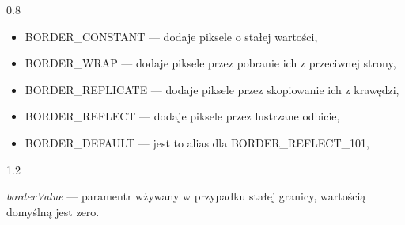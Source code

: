 \documentclass[a4paper,12pt]{article}
\newcommand\spacingInSimpleItemize{0.8}
\newcommand\spacingInSolemnItemize{1.2}
\begin{document}
\begin{spacing}{\spacingInSimpleItemize}
\begin{itemize}
                    \begin{itemize}
                    \item BORDER\_CONSTANT --- dodaje piksele o stałej wartości,\\
                    \item BORDER\_WRAP --- dodaje piksele przez pobranie ich z przeciwnej strony,\\
                    \item BORDER\_REPLICATE --- dodaje piksele przez skopiowanie ich z krawędzi,\\
                    \item BORDER\_REFLECT --- dodaje piksele przez lustrzane odbicie,\\
                    \item BORDER\_DEFAULT --- jest to alias dla  BORDER\_REFLECT\_101,
                    \end{itemize}\begin{spacing}{\spacingInSolemnItemize}
                    \item \textit{borderValue} --- paramentr wżywany w przypadku stałej granicy, wartością domyślną jest zero.  
        		    \end{spacing}
        		 \end{itemize}
        		 \end{spacing}
		        \newpage
\end{document}
